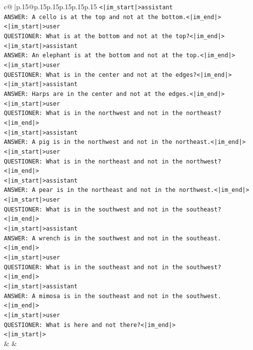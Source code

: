 \documentclass{article}
\begin{document}
{\begin{supertabular}{c@{$\;$}|p{.15\linewidth}@{}p{.15\linewidth}p{.15\linewidth}p{.15\linewidth}p{.15\linewidth}p{.15\linewidth}}
{{{\texttt{<|im\_start|>assistant} \\
\texttt{ANSWER: A cello is at the top and not at the bottom.<|im\_end|>} \\
\texttt{<|im\_start|>user} \\
\texttt{QUESTIONER: What is at the bottom and not at the top?<|im\_end|>} \\
\texttt{<|im\_start|>assistant} \\
\texttt{ANSWER: An elephant is at the bottom and not at the top.<|im\_end|>} \\
\texttt{<|im\_start|>user} \\
\texttt{QUESTIONER: What is in the center and not at the edges?<|im\_end|>} \\
\texttt{<|im\_start|>assistant} \\
\texttt{ANSWER: Harps are in the center and not at the edges.<|im\_end|>} \\
\texttt{<|im\_start|>user} \\
\texttt{QUESTIONER: What is in the northwest and not in the northeast?<|im\_end|>} \\
\texttt{<|im\_start|>assistant} \\
\texttt{ANSWER: A pig is in the northwest and not in the northeast.<|im\_end|>} \\
\texttt{<|im\_start|>user} \\
\texttt{QUESTIONER: What is in the northeast and not in the northwest?<|im\_end|>} \\
\texttt{<|im\_start|>assistant} \\
\texttt{ANSWER: A pear is in the northeast and not in the northwest.<|im\_end|>} \\
\texttt{<|im\_start|>user} \\
\texttt{QUESTIONER: What is in the southwest and not in the southeast?<|im\_end|>} \\
\texttt{<|im\_start|>assistant} \\
\texttt{ANSWER: A wrench is in the southwest and not in the southeast.<|im\_end|>} \\
\texttt{<|im\_start|>user} \\
\texttt{QUESTIONER: What is in the southeast and not in the southwest?<|im\_end|>} \\
\texttt{<|im\_start|>assistant} \\
\texttt{ANSWER: A mimosa is in the southeast and not in the southwest.<|im\_end|>} \\
\texttt{<|im\_start|>user} \\
\texttt{QUESTIONER: What is here and not there?<|im\_end|>} \\
\texttt{<|im\_start|>} \\
            }
        }
    }
    & & \\ \\


\end{supertabular}}
\end{document}
